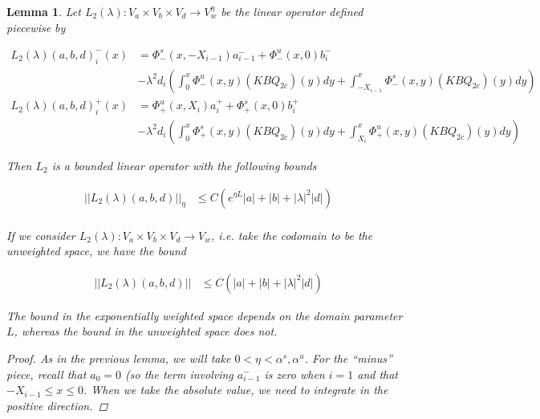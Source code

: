 \documentclass[12pt]{article}
\newtheorem{lemma}{Lemma}
\begin{document}
\begin{lemma}

Let $L_2(\lambda): V_a \times V_b \times V_d \rightarrow V_w^\eta$ be the linear operator defined piecewise by

\begin{align*}
L_2(\lambda)(a, b, d)_i^-(x) &= \Phi^s_-(x, -X_{i-1})a^-_{i-1} + \Phi^u_-(x, 0)b_i^- \\
&- \lambda^2 d_i \left( \int_0^x \Phi^u_-(x, y)(KBQ_{2c})(y) dy  + \int_{-X_{i-1}}^x \Phi^s_-(x, y)(KBQ_{2c})(y) dy \right)\\
L_2(\lambda)(a, b, d)_i^+(x) &= \Phi^u_+(x, X_i)a^+_{i} + \Phi^s_+(x, 0)b_i^+ \\
&- \lambda^2 d_i \left( \int_0^x \Phi^s_+(x, y)(KBQ_{2c})(y) dy + \int_{X_{i}}^x \Phi^u_+(x, y)(KBQ_{2c})(y) dy \right)
\end{align*}

Then $L_2$ is a bounded linear operator with the following bounds

\begin{align*}
||L_2(\lambda)(a, b, d)||_\eta &\leq C(e^{\eta L}|a| + |b| + |\lambda|^2 |d|) \\
\end{align*}

If we consider $L_2(\lambda): V_a \times V_b \times V_d \rightarrow V_w$, i.e. take the codomain to be the unweighted space, we have the bound 

\begin{align*}
||L_2(\lambda)(a, b, d)|| &\leq C(|a| + |b| + |\lambda|^2 |d|)
\end{align*}

The bound in the exponentially weighted space depends on the domain parameter $L$, whereas the bound in the unweighted space does not.

\begin{proof}

As in the previous lemma, we will take $0 < \eta < \alpha^s, \alpha^u$. For the ``minus'' piece, recall that $a_0 = 0$ (so the term involving $a^-_{i-1}$ is zero when $i = 1$ and that $-X_{i-1} \leq x \leq 0$. When we take the absolute value, we need to integrate in the positive direction.


\end{proof}
\end{lemma}
\end{document}
